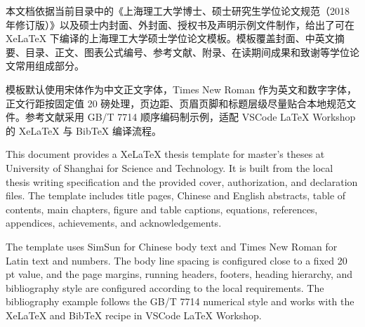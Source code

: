 \begin{cnabstract}
本文档依据当前目录中的《上海理工大学博士、硕士研究生学位论文规范（2018 年修订版）》以及硕士内封面、外封面、授权书及声明示例文件制作，给出了可在 XeLaTeX 下编译的上海理工大学硕士学位论文模板。模板覆盖封面、中英文摘要、目录、正文、图表公式编号、参考文献、附录、在读期间成果和致谢等学位论文常用组成部分。

模板默认使用宋体作为中文正文字体，Times New Roman 作为英文和数字字体，正文行距按固定值 20 磅处理，页边距、页眉页脚和标题层级尽量贴合本地规范文件。参考文献采用 GB/T 7714 顺序编码制示例，适配 VSCode LaTeX Workshop 的 XeLaTeX 与 BibTeX 编译流程。

\end{cnabstract}

\begin{enabstract}
This document provides a XeLaTeX thesis template for master's theses at University of Shanghai for Science and Technology. It is built from the local thesis writing specification and the provided cover, authorization, and declaration files. The template includes title pages, Chinese and English abstracts, table of contents, main chapters, figure and table captions, equations, references, appendices, achievements, and acknowledgements.

The template uses SimSun for Chinese body text and Times New Roman for Latin text and numbers. The body line spacing is configured close to a fixed 20 pt value, and the page margins, running headers, footers, heading hierarchy, and bibliography style are configured according to the local requirements. The bibliography example follows the GB/T 7714 numerical style and works with the XeLaTeX and BibTeX recipe in VSCode LaTeX Workshop.


\end{enabstract}
